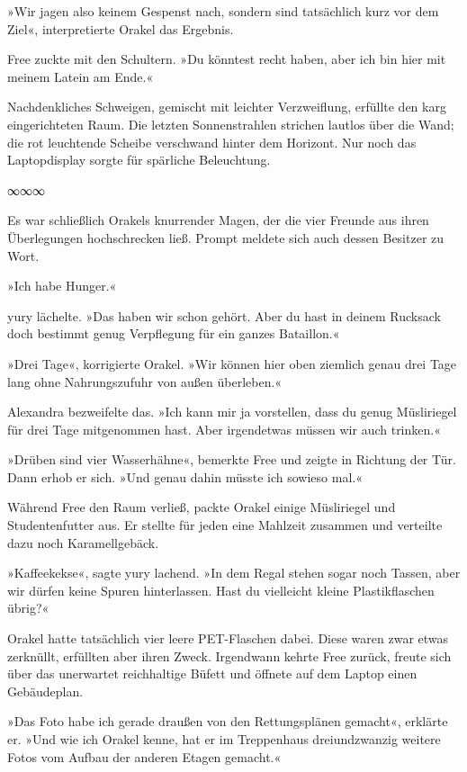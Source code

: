»Wir jagen also keinem Gespenst nach, sondern sind tatsächlich kurz vor dem Ziel«, interpretierte Orakel das Ergebnis.

Free zuckte mit den Schultern. »Du könntest recht haben, aber ich bin hier mit meinem Latein am Ende.«

Nachdenkliches Schweigen, gemischt mit leichter Verzweiflung, erfüllte den karg eingerichteten Raum. Die letzten Sonnenstrahlen strichen lautlos über die Wand; die rot leuchtende Scheibe verschwand hinter dem Horizont. Nur noch das Laptopdisplay sorgte für spärliche Beleuchtung.

\begin{center}
	∞∞∞
\end{center}

Es war schließlich Orakels knurrender Magen, der die vier Freunde aus ihren Überlegungen hochschrecken ließ. Prompt meldete sich auch dessen Besitzer zu Wort.

»Ich habe Hunger.«

yury lächelte. »Das haben wir schon gehört. Aber du hast in deinem Rucksack doch bestimmt genug Verpflegung für ein ganzes Bataillon.«

»Drei Tage«, korrigierte Orakel. »Wir können hier oben ziemlich genau drei Tage lang ohne Nahrungszufuhr von außen überleben.«

Alexandra bezweifelte das. »Ich kann mir ja vorstellen, dass du genug Müsliriegel für drei Tage mitgenommen hast. Aber irgendetwas müssen wir auch trinken.«

»Drüben sind vier Wasserhähne«, bemerkte Free und zeigte in Richtung der Tür. Dann erhob er sich. »Und genau dahin müsste ich sowieso mal.«

Während Free den Raum verließ, packte Orakel einige Müsliriegel und Studentenfutter aus. Er stellte für jeden eine Mahlzeit zusammen und verteilte dazu noch Karamellgebäck.

»Kaffeekekse«, sagte yury lachend. »In dem Regal stehen sogar noch Tassen, aber wir dürfen keine Spuren hinterlassen. Hast du vielleicht kleine Plastikflaschen übrig?«

Orakel hatte tatsächlich vier leere PET-Flaschen dabei. Diese waren zwar etwas zerknüllt, erfüllten aber ihren Zweck. Irgendwann kehrte Free zurück, freute sich über das unerwartet reichhaltige Büfett und öffnete auf dem Laptop einen Gebäudeplan.

»Das Foto habe ich gerade draußen von den Rettungsplänen gemacht«, erklärte er. »Und wie ich Orakel kenne, hat er im Treppenhaus dreiundzwanzig weitere Fotos vom Aufbau der anderen Etagen gemacht.«

